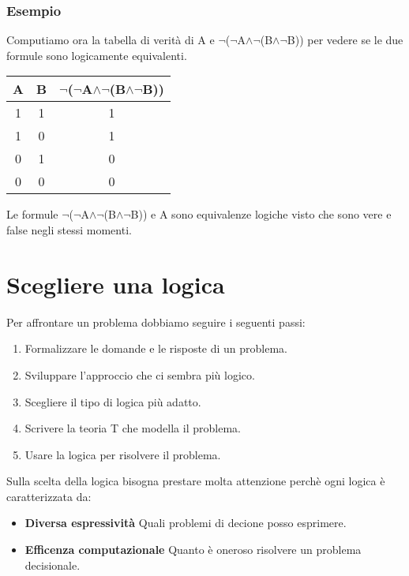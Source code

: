 \documentclass[../main.tex]{subfiles}
\begin{document}
    \subsubsection{Esempio}
    Computiamo ora la tabella di verità di A e $\lnot$($\lnot$A$\land \lnot$(B$\land \lnot$B)) per vedere se le due formule sono logicamente equivalenti.
    \begin{center}
        \begin{tabular}{|c|c|c|}
            \hline
            A & B & $\lnot$($\lnot$A$\land \lnot$(B$\land \lnot$B))\\
            \hline
            1 & 1 & 1\\
            \hline
            1 & 0 & 1\\
            \hline
            0 & 1 & 0\\
            \hline
            0 & 0 & 0\\
            \hline
        \end{tabular}
    \end{center}
    Le formule $\lnot$($\lnot$A$\land \lnot$(B$\land \lnot$B)) e A sono equivalenze logiche visto che sono vere e false negli stessi momenti.

    \section{Scegliere una logica}
    Per affrontare un problema dobbiamo seguire i seguenti passi:
    \begin{enumerate}
        \item Formalizzare le domande e le risposte di un problema.
        \item Sviluppare l'approccio che ci sembra più logico.
        \item Scegliere il tipo di logica più adatto.
        \item Scrivere la teoria T che modella il problema.
        \item Usare la logica per risolvere il problema.
    \end{enumerate}
    Sulla scelta della logica bisogna prestare molta attenzione perchè ogni logica è caratterizzata da:
    \begin{itemize}
        \item \textbf{Diversa espressività} Quali problemi di decione posso esprimere.
        \item \textbf{Efficenza computazionale} Quanto è oneroso risolvere un problema decisionale.
    \end{itemize}
\end{document}
